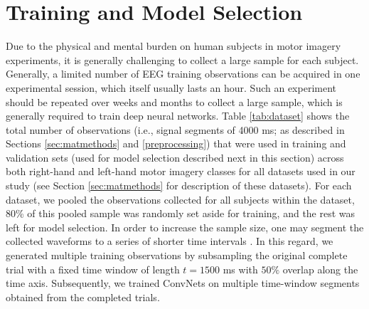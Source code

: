 \documentclass{ieeeaccess}
\begin{document}
    
\section{Training and Model Selection}
 \label{modelselect}
    
    
Due to the physical and mental burden on human subjects in motor imagery experiments, it is generally challenging to collect a large sample for each subject. Generally, a limited number of EEG training observations can be acquired in one experimental session, which itself usually lasts an hour. Such an experiment should be repeated over weeks and months to collect a large sample, which is generally required to train deep neural networks. Table \ref{tab:dataset} shows the total number of observations (i.e.,  signal segments of 4000 ms; as described in Sections \ref{sec:matmethods} and \ref{preprocessing}) that were used in training and validation sets (used for model selection described next in this section) across both right-hand and left-hand motor imagery classes for all datasets used in our study (see Section \ref{sec:matmethods} for description of these datasets).  {For each dataset, we pooled the observations collected for all subjects within the dataset, 80\% of this pooled sample was randomly set aside for training, and the rest was left for model selection. In order to increase the sample size, one may segment the collected waveforms to a series of shorter time intervals \cite{schirrmeister2017deep, Kay2013}}. In this regard, we generated multiple training observations by subsampling the original complete trial with a fixed time window of length $t = 1500$ ms with $50\%$ overlap along the time axis. Subsequently, we trained ConvNets on multiple time-window segments obtained from the completed trials. 
    
\end{document}
